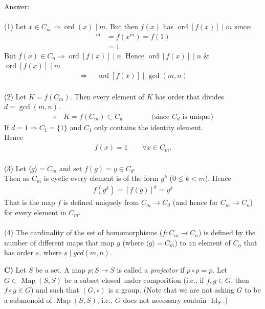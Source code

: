 \documentclass[12pt,a4paper]{article}
\begin{document}
\vspace{1cm}
\noindent
Answer:\\
\\
(1) Let $x\in C_m\Rightarrow\operatorname{ord}(x)\mid m$.  But then $f(x)$ has $\operatorname{ord}[f(x)]\mid m$ since:
\begin{align*}
[f(x)]^m&=f(x^m)=f(1)\\
&=1
\end{align*}
But $f(x)\in C_n\Rightarrow\operatorname{ord}[f(x)]\mid n$.  Hence $\operatorname{ord}[f(x)]\mid n$ \& $\operatorname{ord}[f(x)]\mid m$
\begin{align*}
\Rightarrow\quad\operatorname{ord}[f(x)]\mid\gcd(m,n)
\end{align*}
\\
(2) Let $K=f(C_m)$.  Then every element of $K$ has order that divides $d=\gcd(m,n)$.
\begin{align*}
\therefore\quad K=f(C_m)\subset C_d \quad\quad\quad\quad \text{(since $C_d$ is unique)}
\end{align*}
If $d=1\Rightarrow C_1=\{1\}$ and $C_1$ only contains the identity element.\\
Hence
\begin{align*}
f(x)=1\qquad\forall x\in C_m.
\end{align*}
\\
(3) Let $\langle g\rangle=C_m$ and set $f(g)=y\in C_d$.\\
Then as $C_m$ is cyclic every element is of the form $g^k$ ($0\leq k<m$). Hence
\begin{align*}
f(g^k)=[f(g)]^k=y^k
\end{align*}
That is the map $f$ is defined uniquely from $C_m\to C_d$ (and hence for $C_m\to C_n$) for every element
in $C_m$.\\
\\
(4) The cardinality of the set of homomorphisms ($f: C_m \to C_n$) is defined by the number of different
maps that map $g$ (where $\langle g \rangle = C_m$) to an element of $C_n$ that has order $s$, where $s \mid gcd(m,n)$.

\newpage

\noindent\textbf{C)} Let $S$ be a set. A map $p:S\to S$ is called a \textit{projector} if $p\circ p=p$. Let $G\subset\operatorname{Map}(S,S)$ be a subset closed under composition (i.e., if $f,g\in G$, then $f\circ g\in G$) and such that $(G,\circ)$ is a group. (Note that we are not asking $G$ to be a submonoid of $\operatorname{Map}(S,S)$, i.e., $G$ does not necessary contain $\operatorname{Id}_S$.)
\end{document}
